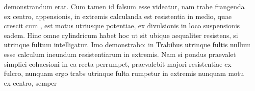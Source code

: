 demonstrandum erat.
Cum tamen id falsum esse videatur,
nam trabe\protect{} frangenda ex centro,
 appensionis,
in extremis calculanda est resistentia in medio,\protect{} quae crescit cum , est  motus utriusque potentiae, ex divulsionis\protect{} in loco suspensionis eadem. Hinc omne cylindricum habet hoc ut sit ubique aequaliter resistens, si utrinque fultum intelligatur. Imo demonstrabo: in Trabibus utrinque fultis nullum esse calculum ineundum resistentiarum in extremis.
Nam si pondus\protect{} praevalet simplici cohaesioni\protect{} in ea recta perrumpet,  praevalebit majori resistentiae\protect{} ex fulcro, nunquam ergo trabs\protect{} utrinque fulta rumpetur in extremis nunquam motu ex centro, semper 
\pend
\count{}
\count{}
\count{}
